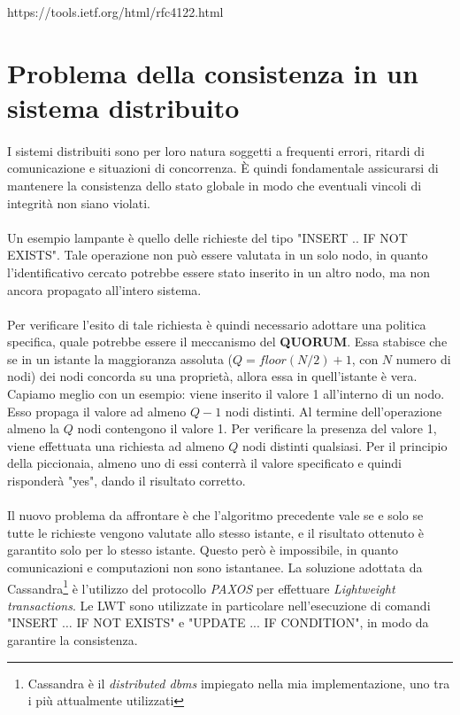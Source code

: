 \documentclass[11pt,a4paper,english]{article}
\begin{document}
https://tools.ietf.org/html/rfc4122.html


\section{Problema della consistenza in un sistema distribuito}

\paragraph{} I sistemi distribuiti sono per loro natura soggetti a frequenti errori, ritardi di comunicazione e situazioni di concorrenza. È quindi fondamentale assicurarsi di mantenere la consistenza\cite{consistency} dello stato globale in modo che eventuali vincoli di integrità non siano violati. 

\paragraph{} Un esempio lampante è quello delle richieste del tipo "INSERT .. IF NOT EXISTS". Tale operazione non può essere valutata in un solo nodo, in quanto l'identificativo cercato potrebbe essere stato inserito in un altro nodo, ma non ancora propagato all'intero sistema. 

\paragraph{} Per verificare l'esito di tale richiesta è quindi necessario adottare una politica specifica, quale potrebbe essere il meccanismo del \textbf{QUORUM}\cite{quorum}. Essa stabisce che se in un istante la maggioranza assoluta ($Q=floor(N/2) + 1$, con $N$ numero di nodi) dei nodi concorda su una proprietà, allora essa in quell'istante è vera. Capiamo meglio con un esempio: viene inserito il valore 1 all'interno di un nodo. Esso propaga il valore ad almeno $Q-1$ nodi distinti. Al termine dell'operazione almeno la $Q$ nodi contengono il valore 1. Per verificare la presenza del valore 1, viene effettuata una richiesta ad almeno $Q$ nodi distinti qualsiasi. Per il principio della piccionaia, almeno uno di essi conterrà il valore specificato e quindi risponderà "yes", dando il risultato corretto. 

\paragraph{} Il nuovo problema da affrontare è che l'algoritmo precedente vale se e solo se tutte le richieste vengono valutate allo stesso istante, e il risultato ottenuto è garantito solo per lo stesso istante. Questo però è impossibile, in quanto comunicazioni e computazioni non sono istantanee. La soluzione adottata da Cassandra\footnote{Cassandra è il \emph{distributed dbms} impiegato nella mia implementazione, uno tra i più attualmente utilizzati} è l'utilizzo del protocollo \emph{PAXOS}\cite{paxos} per effettuare \emph{Lightweight transactions}\cite{lwt}. Le LWT sono utilizzate in particolare nell'esecuzione di comandi "INSERT $\dots$ IF NOT EXISTS" e "UPDATE ... IF CONDITION", in modo da garantire la consistenza.  
\end{document}
